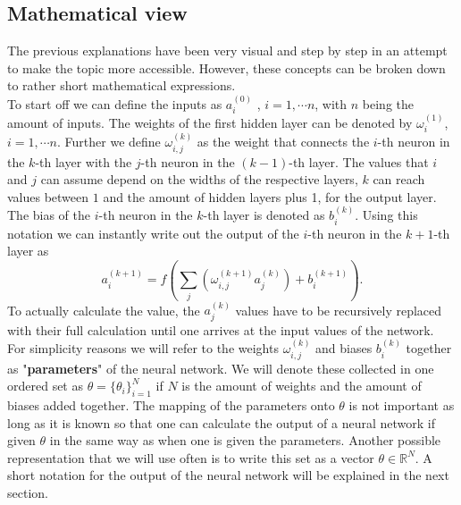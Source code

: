\subsection{Mathematical view}
The previous explanations have been very visual and step by step in an attempt to make the topic more accessible. However, these concepts can be broken down to rather short mathematical expressions.\\
To start off we can define the inputs as $a_i^{(0)}$ , $i =  1, \dotsb n$, with $n$ being the amount of inputs. The weights of the first hidden layer can be denoted by $\omega_{i}^{(1)}$, $i =  1, \dotsb n$. Further we define $\omega_{i,j}^{(k)}$ as the weight that connects the $i$-th neuron in the $k$-th layer with the $j$-th neuron in the $(k-1)$-th layer. The values that $i$ and $j$ can assume depend on the widths of the respective layers, $k$ can reach values between $1$ and the amount of hidden layers plus 1, for the output layer. The bias of the $i$-th neuron in the $k$-th layer is denoted as $b_i^{(k)}$. Using this notation we can instantly write out the output of the $i$-th neuron in the $k+1$-th layer as
\begin{equation}
	a_i^{(k+1)} = f\left(\sum_j \left(\omega_{i,j}^{(k+1)}a_j^{(k)}\right) + b_i^{(k+1)}\right).
\end{equation}
To actually calculate the value, the $a_j^{(k)}$ values have to be recursively replaced with their full calculation until one arrives at the input values of the network.\\
For simplicity reasons we will refer to the weights $\omega_{i,j}^{(k)}$ and biases $b_i^{(k)}$ together as "\textbf{parameters}" of the neural network. We will denote these collected in one ordered set as $\theta = \{\theta_i\}_{i=1}^{N}$ if $N$ is the amount of weights and the amount of biases added together. The mapping of the parameters onto $\theta$ is not important as long as it is known so that one can calculate the output of a neural network if given $\theta$ in the same way as when one is given the parameters. Another possible representation that we will use often is to write this set as a vector $\theta \in \mathbb{R}^N$. A short notation for the output of the neural network will be explained in the next section.
